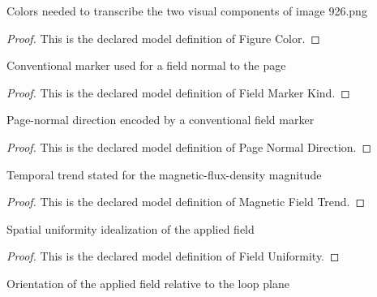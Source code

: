 \begin{definition}
  \label{def:physics:phyx-mini-0926:phyxminiproblems-problemphyxmini0926-figurecolor}
  Colors needed to transcribe the two visual components of image 926.png
\end{definition}
\begin{proof}
  This is the declared model definition of Figure Color.
\end{proof}
\begin{definition}
  \label{def:physics:phyx-mini-0926:phyxminiproblems-problemphyxmini0926-fieldmarkerkind}
  Conventional marker used for a field normal to the page
\end{definition}
\begin{proof}
  This is the declared model definition of Field Marker Kind.
\end{proof}
\begin{definition}
  \label{def:physics:phyx-mini-0926:phyxminiproblems-problemphyxmini0926-pagenormaldirection}
  Page-normal direction encoded by a conventional field marker
\end{definition}
\begin{proof}
  This is the declared model definition of Page Normal Direction.
\end{proof}
\begin{definition}
  \label{def:physics:phyx-mini-0926:phyxminiproblems-problemphyxmini0926-magneticfieldtrend}
  Temporal trend stated for the magnetic-flux-density magnitude
\end{definition}
\begin{proof}
  This is the declared model definition of Magnetic Field Trend.
\end{proof}
\begin{definition}
  \label{def:physics:phyx-mini-0926:phyxminiproblems-problemphyxmini0926-fielduniformity}
  Spatial uniformity idealization of the applied field
\end{definition}
\begin{proof}
  This is the declared model definition of Field Uniformity.
\end{proof}
\begin{definition}
  \label{def:physics:phyx-mini-0926:phyxminiproblems-problemphyxmini0926-fieldlooporientation}
  Orientation of the applied field relative to the loop plane
\end{definition}
